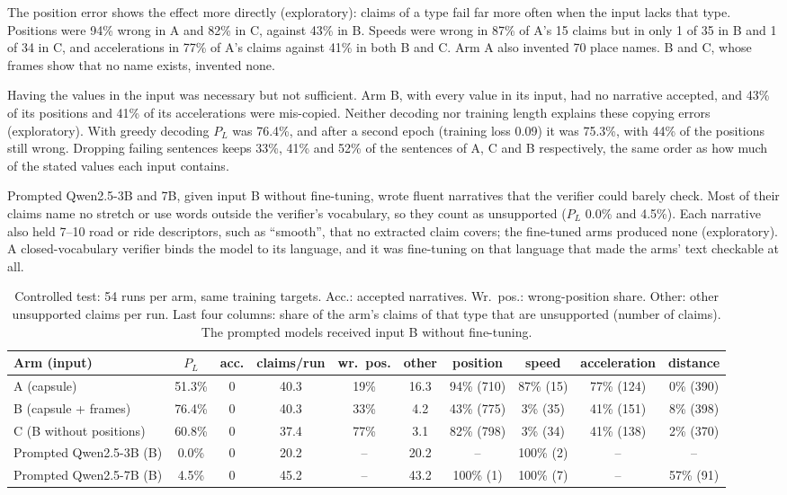 The position error shows the effect more directly (exploratory): claims of a type fail far more often when the input lacks that type.
Positions were 94\% wrong in A and 82\% in C, against 43\% in B. Speeds were wrong in 87\% of A's 15 claims but in only 1 of 35 in B and 1 of 34 in C, and accelerations in 77\% of A's claims against 41\% in both B and C.
Arm A also invented 70 place names. B and C, whose frames show that no name exists, invented none.

Having the values in the input was necessary but not sufficient.
Arm B, with every value in its input, had no narrative accepted, and 43\% of its positions and 41\% of its accelerations were mis-copied.
Neither decoding nor training length explains these copying errors (exploratory). With greedy decoding $P_L$ was 76.4\%, and after a second epoch (training loss 0.09) it was 75.3\%, with 44\% of the positions still wrong.
Dropping failing sentences keeps 33\%, 41\% and 52\% of the sentences of A, C and B respectively, the same order as how much of the stated values each input contains.

Prompted Qwen2.5-3B and 7B, given input B without fine-tuning, wrote fluent narratives that the verifier could barely check.
Most of their claims name no stretch or use words outside the verifier's vocabulary, so they count as unsupported ($P_L$ 0.0\% and 4.5\%). Each narrative also held 7--10 road or ride descriptors, such as ``smooth'', that no extracted claim covers; the fine-tuned arms produced none (exploratory).
A closed-vocabulary verifier binds the model to its language, and it was fine-tuning on that language that made the arms' text checkable at all.

\begin{table}[t]
\caption{Controlled test: 54 runs per arm, same training targets. Acc.: accepted narratives. Wr.\ pos.: wrong-position share. Other: other unsupported claims per run. Last four columns: share of the arm's claims of that type that are unsupported (number of claims). The prompted models received input B without fine-tuning.}
\label{tab:p6}
\centering
\footnotesize
\setlength{\tabcolsep}{5pt}
\begin{tabular}{@{}lccccccccc@{}}
\toprule
Arm (input) & $P_L$ & acc. & claims/run & wr.\ pos. & other & position & speed & acceleration & distance \\
\midrule
A (capsule) & 51.3\% & 0 & 40.3 & 19\% & 16.3 & 94\% (710) & 87\% (15) & 77\% (124) & 0\% (390) \\
B (capsule + frames) & 76.4\% & 0 & 40.3 & 33\% & 4.2 & 43\% (775) & 3\% (35) & 41\% (151) & 8\% (398) \\
C (B without positions) & 60.8\% & 0 & 37.4 & 77\% & 3.1 & 82\% (798) & 3\% (34) & 41\% (138) & 2\% (370) \\
\midrule
Prompted Qwen2.5-3B (B) & 0.0\% & 0 & 20.2 & -- & 20.2 & -- & 100\% (2) & -- & -- \\
Prompted Qwen2.5-7B (B) & 4.5\% & 0 & 45.2 & -- & 43.2 & 100\% (1) & 100\% (7) & -- & 57\% (91) \\
\bottomrule
\end{tabular}
\end{table}


